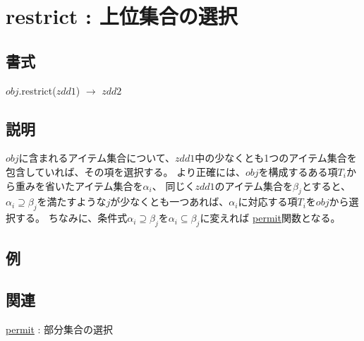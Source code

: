 
\section{restrict : 上位集合の選択\label{sect:restrict}}
\subsection*{書式}
$obj$.restrict($zdd1$) $\rightarrow$ $zdd2$

\subsection*{説明}
$obj$に含まれるアイテム集合について、$zdd1$中の少なくとも1つのアイテム集合を包含していれば、その項を選択する。
より正確には、$obj$を構成するある項$T_i$から重みを省いたアイテム集合を$\alpha_i$、
同じく$zdd1$のアイテム集合を$\beta_j$とすると、
$\alpha_i \supseteq \beta_j$を満たすような$j$が少なくとも一つあれば、$\alpha_i$に対応する項$T_i$を$obj$から選択する。
ちなみに、条件式$\alpha_i \supseteq \beta_j$を$\alpha_i \subseteq \beta_j$に変えれば
\hyperref[sect:permit]{permit}関数となる。

\subsection*{例}


\subsection*{関連}
\hyperref[sect:permit]{permit} : 部分集合の選択
